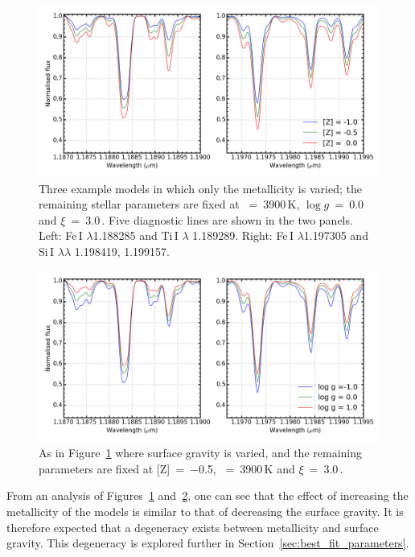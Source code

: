 \begin{figure}
 \centering
\includegraphics[width=\textwidth]{JAnal/varyZv2}
\caption[An example of the effect of metallicity on the appearance of the model gird spectra]{
Three example models in which only the metallicity is varied; the remaining stellar parameters are fixed at \Teff~=~3900\,K, $\log g$~=~0.0 and $\xi$~=~3.0\,\kms.
Five diagnostic lines are shown in the two panels.
Left: Fe\,I $\lambda$1.188285 and Ti\,I $\lambda$ 1.189289.
Right: Fe\,I $\lambda$1.197305 and Si\,I $\lambda\lambda$ 1.198419, 1.199157.\label{fig:mod-z}
         }
\end{figure}
\begin{figure}
 \centering
\includegraphics[width=\textwidth]{JAnal/varygv2}
\caption[An example of the effect of surface gravity on the appearance of the model gird spectra]{
As in Figure~\ref{fig:mod-z} where surface gravity is varied, and the remaining parameters are fixed at [Z]~=~$-$0.5, \Teff~=~3900\,K and $\xi$~=~3.0\,\kms.\label{fig:mod-g}
         }
\end{figure}


From an analysis of Figures~\ref{fig:mod-z} and~\ref{fig:mod-g}, one can see that the effect of increasing the metallicity of the models is similar to that of decreasing the surface gravity.
It is therefore expected that a degeneracy exists between metallicity and surface gravity.
This degeneracy is explored further in Section~\ref{sec:best_fit_parameters}.

